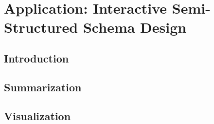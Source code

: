 \chapter{Application: Interactive Semi-Structured Schema Design}
\label{chapter:schemasummarization}

\section{Introduction}
\label{sec:introduction}


\section{Summarization}
\label{sec:distribution}


\section{Visualization}
\label{sec:visualization}


% 

% 

%

%

